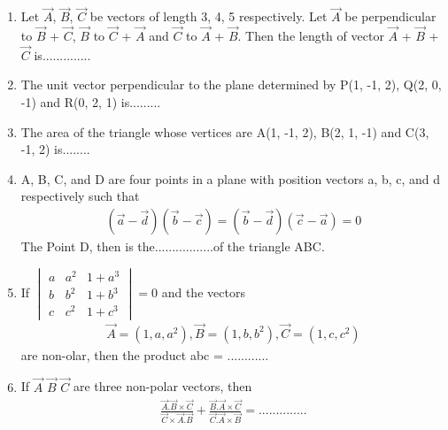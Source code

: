 \renewcommand{\theequation}{\theenumi}
\begin{enumerate}[label=\arabic*.,ref=\thesubsection.\theenumi]

\item Let $\overrightarrow{A}$, $\overrightarrow{B}$, $\overrightarrow{C}$ be vectors of length 3, 4, 5 respectively. Let $\overrightarrow{A}$ be perpendicular to $\overrightarrow{B}$ + $\overrightarrow{C}$, $\overrightarrow{B}$ to 
$\overrightarrow{C}$ + $\overrightarrow{A}$ and $\overrightarrow{C}$ to $\overrightarrow{A}$ + $\overrightarrow{B}$. Then the length of vector $\overrightarrow{A}$ + $\overrightarrow{B}$ + $\overrightarrow{C}$ is..............

\item The unit vector perpendicular to the plane determined by P(1, -1, 2), Q(2, 0, -1) and R(0, 2, 1) is.........

\item The area of the triangle whose vertices are  A(1, -1, 2), B(2, 1, -1) and C(3, -1, 2) is........

\item A, B, C, and D are four points in a plane with position vectors a, b, c, and d respectively such that
\begin{align*}
(\overrightarrow{a} - \overrightarrow{d}) (\overrightarrow{b} - \overrightarrow{c}) 
= (\overrightarrow{b} - \overrightarrow{d}) (\overrightarrow{c} - \overrightarrow{a}) = 0
\end{align*}
The Point D, then is the.................of the triangle ABC.

\item If 
$\begin{vmatrix}
a & a^{2} & 1 + a^{3} \\ b & b^{2} & 1 + b^{3} \\ c & c^{2} & 1 + c^{3} 
\end{vmatrix} = 0$ 
and the vectors 
\begin{align*}
\overrightarrow{A} = (1, a, a^{2}), \overrightarrow{B} = (1, b, b^{2}), \overrightarrow{C} = (1, c, c^{2})
\end{align*}
are non-olar, then the product abc = ............

\item If $\overrightarrow{A}$  $\overrightarrow{B}$  $\overrightarrow{C}$ are three non-polar vectors, then 
\begin{align*}
\frac{\overrightarrow{A} . \overrightarrow{B} \times \overrightarrow{C}}{\overrightarrow{C} \times \overrightarrow{A} . \overrightarrow{B}} + \frac{\overrightarrow{B} . \overrightarrow{A} \times \overrightarrow{C}}{\overrightarrow{C} . \overrightarrow{A} \times \overrightarrow{B}} = ..............
\end{align*}


\end{enumerate}
